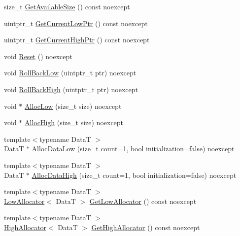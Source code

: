 \begin{DoxyCompactItemize}
\item 
size\+\_\+t \hyperlink{classmage_1_1_double_ended_memory_stack_a7877cc0fc6a67b610aea51097c44fc8d}{Get\+Available\+Size} () const noexcept
\item 
uintptr\+\_\+t \hyperlink{classmage_1_1_double_ended_memory_stack_a6d2875d28aef082ae6d777a2a39e39a9}{Get\+Current\+Low\+Ptr} () const noexcept
\item 
uintptr\+\_\+t \hyperlink{classmage_1_1_double_ended_memory_stack_aecc40b9efe5a18d0c95ca9d6e063bf38}{Get\+Current\+High\+Ptr} () const noexcept
\item 
void \hyperlink{classmage_1_1_double_ended_memory_stack_a99272e80cde12949a31a2942f9d009d6}{Reset} () noexcept
\item 
void \hyperlink{classmage_1_1_double_ended_memory_stack_ad9d2e796dea54978d1909faf329f839b}{Roll\+Back\+Low} (uintptr\+\_\+t ptr) noexcept
\item 
void \hyperlink{classmage_1_1_double_ended_memory_stack_a0c1981cb1fda455a02148f04be1c3ae8}{Roll\+Back\+High} (uintptr\+\_\+t ptr) noexcept
\item 
void $\ast$ \hyperlink{classmage_1_1_double_ended_memory_stack_a4eece9ca8748f77783e8235c6192b260}{Alloc\+Low} (size\+\_\+t size) noexcept
\item 
void $\ast$ \hyperlink{classmage_1_1_double_ended_memory_stack_ab9750ea9abea18890ef432e9f5893ebf}{Alloc\+High} (size\+\_\+t size) noexcept
\item 
{\footnotesize template$<$typename DataT $>$ }\\DataT $\ast$ \hyperlink{classmage_1_1_double_ended_memory_stack_a5dee875f5ba9b279ed4f0b1e3faf1ede}{Alloc\+Data\+Low} (size\+\_\+t count=1, bool initialization=false) noexcept
\item 
{\footnotesize template$<$typename DataT $>$ }\\DataT $\ast$ \hyperlink{classmage_1_1_double_ended_memory_stack_a214b9ca245038c0441d15a5062d6c5f5}{Alloc\+Data\+High} (size\+\_\+t count=1, bool initialization=false) noexcept
\item 
{\footnotesize template$<$typename DataT $>$ }\\\hyperlink{structmage_1_1_double_ended_memory_stack_1_1_low_allocator}{Low\+Allocator}$<$ DataT $>$ \hyperlink{classmage_1_1_double_ended_memory_stack_a9ca15b7e92e19744db2b3c9862062006}{Get\+Low\+Allocator} () const noexcept
\item 
{\footnotesize template$<$typename DataT $>$ }\\\hyperlink{structmage_1_1_double_ended_memory_stack_1_1_high_allocator}{High\+Allocator}$<$ DataT $>$ \hyperlink{classmage_1_1_double_ended_memory_stack_aac1676cde35c58c97ecea8acf123a341}{Get\+High\+Allocator} () const noexcept
\end{DoxyCompactItemize}

